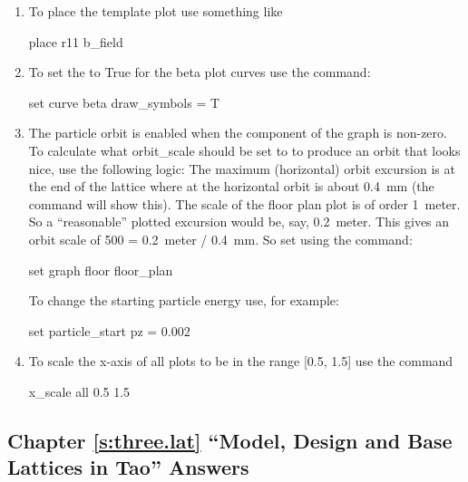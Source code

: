 \documentclass{hitec}     %
\begin{document}
\begin{enumerate}[label=\ref*{s:plotting}.\arabic{enumi}]
\item
To place the  template plot use something like
\begin{code}
place r11 b_field
\end{code}
%
\item
To set the  to True for the beta plot curves use the command:
\begin{code}
set curve beta draw_symbols = T
\end{code}
%
\item
The particle orbit is enabled when the  component of the graph is non-zero.  To
calculate what orbit_scale should be set to to produce an orbit that looks nice, use the following
logic: The maximum (horizontal) orbit excursion is at the end of the lattice where at the horizontal
orbit is about 0.4~mm (the  command will show this). The scale of the floor plan plot
is of order 1~meter. So a ``reasonable'' plotted excursion would be, say, 0.2~meter. This gives an
orbit scale of 500 = 0.2~meter / 0.4~mm. So set  using the command:
\begin{code}
set graph floor floor_plan%
\end{code}
To change the starting particle energy use, for example:
\begin{code}
set particle_start pz = 0.002
\end{code}
%
\item
To scale the x-axis of all plots to be in the range [0.5, 1.5] use the command
\begin{code}
x_scale all 0.5 1.5
\end{code}
\end{enumerate}

\subsection[Chapter \ref*{s:three.lat.ex} ``Model, Design and Base Lattices in Tao'']{Chapter \hyperref[s:three.lat.ex]{\ref*{s:three.lat}} ``Model, Design and Base Lattices in Tao'' Answers}
\label{s:ans.model}
\end{document}
